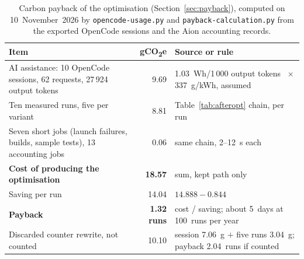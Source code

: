 \documentclass[conference,a4paper]{IEEEtran}
\begin{document}
\begin{table}[!t]
\caption{Carbon payback of the optimisation (Section~\ref{sec:payback}),
computed on 10~November~2026 by \texttt{opencode-usage.py} and
\texttt{payback-calculation.py} from the exported OpenCode sessions and the Aion
accounting records.}
\label{tab:payback}
\centering\footnotesize\setlength{\tabcolsep}{4pt}
\begin{tabular}{@{}lrl@{}}
\toprule
Item & gCO\textsubscript{2}e & Source or rule \\
\midrule
AI assistance: 10 OpenCode sessions, 62 requests, 27\,924 output tokens & 9.69 & 1.03~Wh/1\,000 output tokens~\cite{ries2026s8,oviedo2026} $\times$ 337~g/kWh, assumed \\
Ten measured runs, five per variant & 8.81 & Table~\ref{tab:afteropt} chain, per run \\
Seven short jobs (launch failures, builds, sample tests), 13 accounting jobs & 0.06 & same chain, 2--12~s each \\
\textbf{Cost of producing the optimisation} & \textbf{18.57} & sum, kept path only \\
Saving per run & 14.04 & $14.888 - 0.844$ \\
\textbf{Payback} & \textbf{1.32 runs} & cost / saving; about 5~days at 100~runs per year \\
\midrule
Discarded counter rewrite, not counted & 10.10 & session 7.06~g $+$ five runs 3.04~g; payback 2.04~runs if counted \\
\bottomrule
\end{tabular}
\end{table}

\clearpage
\end{document}
